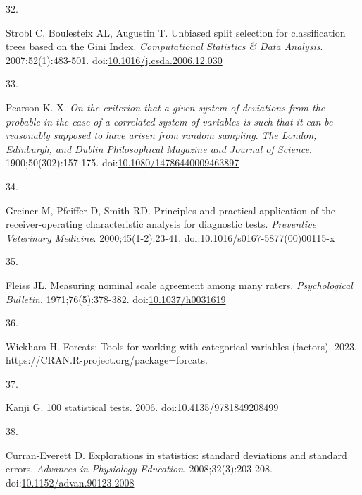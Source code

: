 \documentclass[
]{book}
\newlength{\cslhangindent}
\newlength{\csllabelwidth}
\newlength{\cslentryspacingunit} %
\newenvironment{CSLReferences}[2] %
 {%
  \setlength{\parindent}{0pt}
  \ifodd #1
  \let\oldpar\par
  \def\par{\hangindent=\cslhangindent\oldpar}
  \fi
  \setlength{\parskip}{#2\cslentryspacingunit}
 }%
 {}
\newcommand{\CSLLeftMargin}[1]{\parbox[t]{\csllabelwidth}{#1}}
\newcommand{\CSLRightInline}[1]{\parbox[t]{\linewidth - \csllabelwidth}{#1}\break}
\begin{document}
\begin{CSLReferences}{0}{0}
\leavevmode{}%
\CSLLeftMargin{32. }%
\CSLRightInline{Strobl C, Boulesteix AL, Augustin T. Unbiased split selection for classification trees based on the Gini Index. \emph{Computational Statistics \& Data Analysis}. 2007;52(1):483-501. doi:\href{https://doi.org/10.1016/j.csda.2006.12.030}{10.1016/j.csda.2006.12.030}}

\leavevmode{}%
\CSLLeftMargin{33. }%
\CSLRightInline{Pearson K. X. {\emph{On the criterion that a given system of deviations from the probable in the case of a correlated system of variables is such that it can be reasonably supposed to have arisen from random sampling}}. \emph{The London, Edinburgh, and Dublin Philosophical Magazine and Journal of Science}. 1900;50(302):157-175. doi:\href{https://doi.org/10.1080/14786440009463897}{10.1080/14786440009463897}}

\leavevmode{}%
\CSLLeftMargin{34. }%
\CSLRightInline{Greiner M, Pfeiffer D, Smith RD. Principles and practical application of the receiver-operating characteristic analysis for diagnostic tests. \emph{Preventive Veterinary Medicine}. 2000;45(1-2):23-41. doi:\href{https://doi.org/10.1016/s0167-5877(00)00115-x}{10.1016/s0167-5877(00)00115-x}}

\leavevmode{}%
\CSLLeftMargin{35. }%
\CSLRightInline{Fleiss JL. Measuring nominal scale agreement among many raters. \emph{Psychological Bulletin}. 1971;76(5):378-382. doi:\href{https://doi.org/10.1037/h0031619}{10.1037/h0031619}}

\leavevmode{}%
\CSLLeftMargin{36. }%
\CSLRightInline{Wickham H. Forcats: Tools for working with categorical variables (factors). 2023. \href{https://CRAN.R-project.org/package=forcats}{https://CRAN.R-project.org/package=forcats.}}

\leavevmode{}%
\CSLLeftMargin{37. }%
\CSLRightInline{Kanji G. 100 statistical tests. 2006. doi:\href{https://doi.org/10.4135/9781849208499}{10.4135/9781849208499}}

\leavevmode{}%
\CSLLeftMargin{38. }%
\CSLRightInline{Curran-Everett D. Explorations in statistics: standard deviations and standard errors. \emph{Advances in Physiology Education}. 2008;32(3):203-208. doi:\href{https://doi.org/10.1152/advan.90123.2008}{10.1152/advan.90123.2008}}


\end{CSLReferences}
\end{document}

